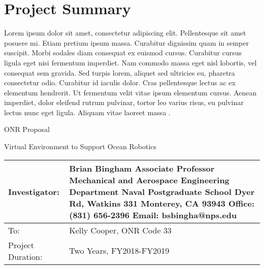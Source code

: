 \documentclass[11pt]{article}
\newcommand{\proposaltitle}{Virtual Environment to Support Ocean Robotics}
\begin{document}
\section*{Project Summary}
Lorem ipsum dolor sit amet, consectetur adipiscing elit. Pellentesque sit amet posuere mi. Etiam pretium ipsum massa. Curabitur dignissim quam in semper suscipit. Morbi sodales diam consequat ex euismod cursus. Curabitur cursus ligula eget nisi fermentum imperdiet. Nam commodo massa eget nisl lobortis, vel consequat sem gravida. Sed turpis lorem, aliquet sed ultricies eu, pharetra consectetur odio. Curabitur id iaculis dolor. Cras pellentesque lectus ac ex elementum hendrerit. Ut fermentum velit vitae ipsum elementum cursus. Aenean imperdiet, dolor eleifend rutrum pulvinar, tortor leo varius risus, eu pulvinar lectus nunc eget ligula. Aliquam vitae laoreet massa \cite{cook14survey}.

\newpage
\setcounter{page}{1}
\begin{center}

\vspace*{0.25in}

{\Large ONR Proposal}

\vspace*{0.25in}

{\huge \proposaltitle}

\vspace*{0.5in}
\renewcommand{\arraystretch}{2.0}
\begin{tabular}{|p{1.5in}|p{2.5in}|} \hline
Investigator: & 
  Brian Bingham \newline
  Associate Professor \newline
  Mechanical and Aerospace Engineering Department \newline
  Naval Postgraduate School  \newline
  700 Dyer Rd, Watkins 331  \newline
  Monterey, CA 93943  \newline
  Office: (831) 656-2396  \newline
  Email: bsbingha@nps.edu  \newline
\\ \hline
To: & Kelly Cooper, ONR Code 33 
\\ \hline
Project Duration: & Two Years, FY2018-FY2019 
\\ \hline
 
\end{tabular}
\end{center}
\vspace*{\fill}
\pagebreak
\end{document}

